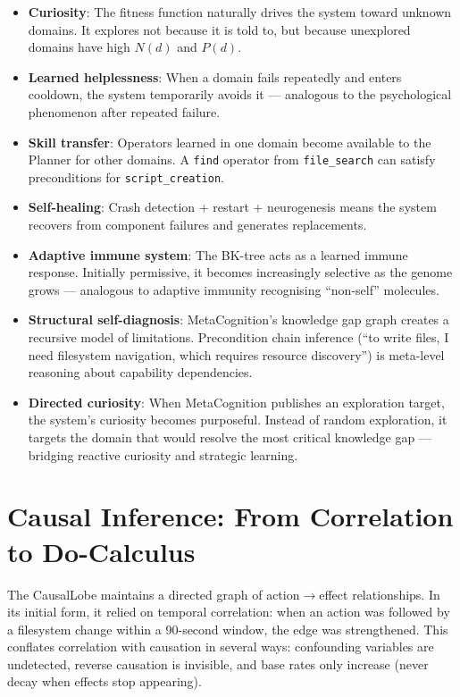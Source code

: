 \documentclass[12pt,a4paper]{report}
\begin{document}
\begin{itemize}
    \item \textbf{Curiosity}: The fitness function naturally drives the system toward unknown domains. It explores not because it is told to, but because unexplored domains have high $N(d)$ and $P(d)$.
    \item \textbf{Learned helplessness}: When a domain fails repeatedly and enters cooldown, the system temporarily avoids it --- analogous to the psychological phenomenon after repeated failure.
    \item \textbf{Skill transfer}: Operators learned in one domain become available to the Planner for other domains. A \texttt{find} operator from \texttt{file\_search} can satisfy preconditions for \texttt{script\_creation}.
    \item \textbf{Self-healing}: Crash detection + restart + neurogenesis means the system recovers from component failures and generates replacements.
    \item \textbf{Adaptive immune system}: The BK-tree acts as a learned immune response. Initially permissive, it becomes increasingly selective as the genome grows --- analogous to adaptive immunity recognising ``non-self'' molecules.
    \item \textbf{Structural self-diagnosis}: MetaCognition's knowledge gap graph creates a recursive model of limitations. Precondition chain inference (``to write files, I need filesystem navigation, which requires resource discovery'') is meta-level reasoning about capability dependencies.
    \item \textbf{Directed curiosity}: When MetaCognition publishes an exploration target, the system's curiosity becomes purposeful. Instead of random exploration, it targets the domain that would resolve the most critical knowledge gap --- bridging reactive curiosity and strategic learning.
\end{itemize}

\section{Causal Inference: From Correlation to Do-Calculus}
The CausalLobe maintains a directed graph of action$\to$effect relationships. In its initial form, it relied on temporal correlation: when an action was followed by a filesystem change within a 90-second window, the edge was strengthened. This conflates correlation with causation in several ways: confounding variables are undetected, reverse causation is invisible, and base rates only increase (never decay when effects stop appearing).
\end{document}
